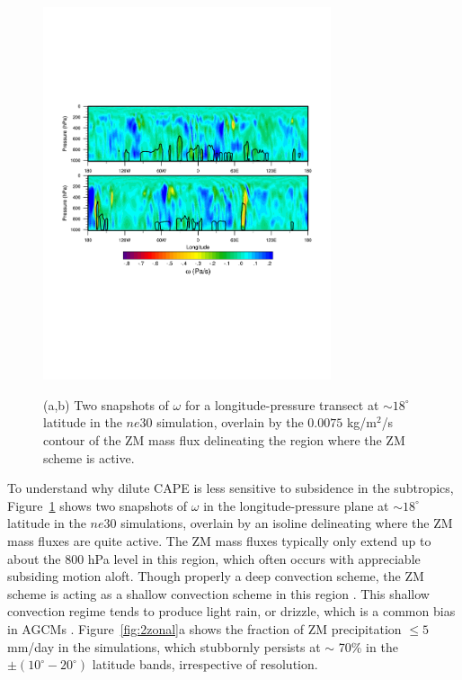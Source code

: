 \documentclass[times]{qjrms4}
\begin{document}
\begin{figure}
\begin{center}
\noindent\includegraphics[width=20pc,angle=0]{figs/temp_trans.pdf}\\
\end{center}
\caption{(a,b) Two snapshots of $\omega$ for a longitude-pressure transect at $\sim 18^{\circ}$ latitude in the $ne30$ simulation, overlain by the $0.0075$ kg/m$^2$/s contour of the ZM mass flux delineating the region where the ZM scheme is active.}
\label{fig:transect}
\end{figure}

To understand why dilute CAPE is less sensitive to subsidence in the subtropics, Figure~\ref{fig:transect} shows two snapshots of $\omega$ in the longitude-pressure plane at  $\sim 18^{\circ}$ latitude in the $ne30$ simulations, overlain by an isoline delineating where the ZM mass fluxes are quite active. The ZM mass fluxes typically only extend up to about the 800 hPa level in this region, which often occurs with appreciable subsiding motion aloft. Though properly a deep convection scheme, the ZM scheme is acting as a shallow convection scheme in this region \citep{TETAL2016AGU}. This shallow convection regime tends to produce light rain, or drizzle, which is a common bias in AGCMs \citep{D2006JCLIM}. Figure~\ref{fig:2zonal}a shows the fraction of ZM precipitation $\leq 5$ mm/day in the simulations, which stubbornly persists at $\sim$ 70\% in the $\pm \left(10^{\circ}-20^{\circ} \right)$ latitude bands, irrespective of resolution.
\end{document}
